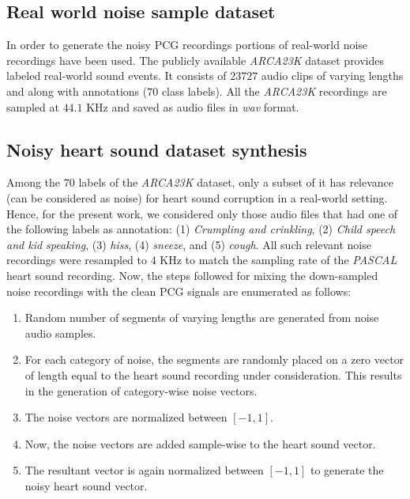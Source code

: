 \documentclass[sigconf,screen]{acmart}
\begin{document}
\subsection{Real world noise sample dataset}
In order to generate the noisy PCG recordings portions of real-world noise recordings have been used. The publicly available \textit{ARCA23K} dataset \cite{Iqbal2021} provides labeled real-world sound events. It consists of $23727$ audio clips of varying lengths and along with annotations ($70$ class labels). All the \textit{ARCA23K} recordings are sampled at $44.1$ KHz and saved as audio files in \textit{wav} format.
\subsection{Noisy heart sound dataset synthesis}
Among the $70$ labels of the \textit{ARCA23K} dataset, only a subset of it has relevance (can be considered as noise) for heart sound corruption in a real-world setting. Hence, for the present work, we considered only those audio files that had one of the following labels as annotation: (1) \textit{Crumpling and crinkling}, (2) \textit{Child speech and kid speaking}, (3) \textit{hiss}, (4) \textit{sneeze}, and (5) \textit{cough}. 
All such relevant noise recordings were resampled to $4$ KHz to match the sampling rate of the \textit{PASCAL} heart sound recording. Now, the steps followed for mixing the down-sampled noise recordings with the clean PCG signals are enumerated as follows: 
\begin{enumerate}
	\item Random number of segments of varying lengths are generated from noise audio samples.
	\item For each category of noise, the segments are randomly placed on a zero vector of length equal to the heart sound recording under consideration. This results in the generation of category-wise noise vectors.
	\item The noise vectors are normalized between $[-1,1]$.
	\item Now, the noise vectors are added sample-wise to the heart sound vector.
	\item The resultant vector is again normalized between $[-1,1]$ to generate the noisy heart sound vector.
\end{enumerate}
\end{document}
